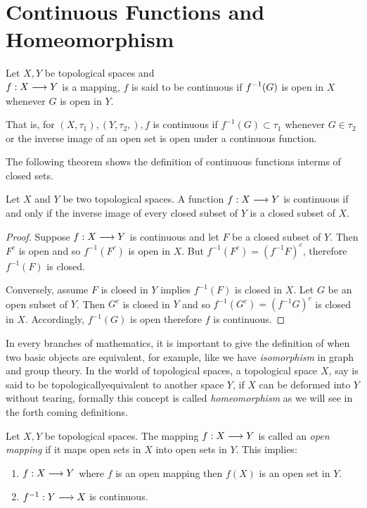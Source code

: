 \section{Continuous Functions and Homeomorphism}

\begin{defn}
    Let $X,Y$ be topological spaces and \\
    $\displaystyle f: X \longrightarrow Y$ is a mapping, $f$ is said to be continuous if $\displaystyle f^{-1}(G)$ is open in $X$ whenever $G$ is open in $Y$.

    That is, for $(X, \tau_1),(Y, \tau_2,), f$ is continuous if $f^{-1} (G) \subset \tau_1$ whenever $G \in \tau_2$ or the inverse image of an open set is open under a continuous function.
\end{defn}
The following theorem shows the definition of continuous functions interms of closed sets.

\begin{thm}
    Let $X$ and $Y$ be two topological spaces. A function $f : X \longrightarrow Y$ is continuous if and only if the inverse image of every closed subset of $Y$ is a closed subset of $X$.
\end{thm}

\begin{proof}
    Suppose $f : X \longrightarrow Y$ is continuous and let $F$ be a closed subset of $Y$. Then $F^c$ is open and so $f^{-1}(F^c)$ is open in $X$. But $f^{-1}(F^c) = (f^{-1} F)^c$, therefore $f^{-1}(F)$ is closed.

    Conversely, assume $F$ is closed in $Y$ implies $f^{-1}(F)$ is closed in $X$. Let $G$ be an open subset of $Y$. Then $G^c$ is closed in $Y$ and so $f^{-1}(G^c) = (f^{-1}G)^c$ is closed in $X$. Accordingly, $f^{-1}(G)$ is open therefore $f$ is continuous.
\end{proof}

In every branches of mathematics, it is important to give the definition of when two basic objects are equivalent, for example, like we have \textit{isomorphism} in graph and group theory. In the world of topological spaces, a topological space $X$, say is said to be topologicallyequivalent to another space $Y$, if $X$ can be deformed into $Y$ without tearing, formally this concept is called \textit{homeomorphism} as we will see in the forth coming definitions.

\begin{defn}
    Let $X,Y$ be topological spaces. The mapping $f: X \longrightarrow Y$ is called an \textit{open mapping} if it maps open sets in $X$ into open sets in $Y$. This implies:
    \begin{enumerate}
        \item $f: X \longrightarrow Y$ where $f$ is an open mapping then $f(X)$ is an open set in $Y$.
        \item $f^{-1}: Y \longrightarrow X$ is continuous. 
    \end{enumerate}
\end{defn}

